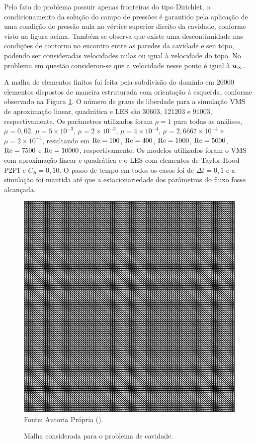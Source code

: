 Pelo fato do problema possuir apenas fronteiras do tipo Dirichlet, o condicionamento da solução do campo de pressões é garantido pela aplicação de uma condição de pressão nula no vértice superior direito da cavidade, conforme visto na figura acima.  Também se observa que existe uma descontinuidade nas condições de contorno no encontro entre as paredes da cavidade e seu topo, podendo ser consideradas velocidades nulas ou igual à velocidade do topo. No problema em questão considerou-se que a velocidade nesse ponto é igual à $\boldsymbol{u}_\infty$.

A malha de elementos finitos foi feita pela subdivisão do domínio em 20000 elementos dispostos de maneira estruturada com orientação à esquerda, conforme observado na Figura \ref{fig:cavity_disc}. O número de graus de liberdade para a simulação VMS de aproximação linear, quadrática e LES são 30603, 121203 e 91003, respectivamente. Os parâmetros utilizados foram $\rho=1$ para todas as análises, $\mu=0,02$, $\mu=5\times10^{-3}$, $\mu=2\times10^{-3}$, $\mu=4\times10^{-4}$, $\mu=2,6667\times10^{-4}$ e $\mu=2\times10^{-4}$, resultando em $\mathrm{Re}=100$, $\mathrm{Re}=400$, $\mathrm{Re}=1000$, $\mathrm{Re}=5000$, $\mathrm{Re}=7500$ e $\mathrm{Re}=10000$, respectivamente. Os modelos utilizados foram o VMS com aproximação linear e quadrática e o LES com elementos de Taylor-Hood P2P1 e $C_S=0,10$. O passo de tempo em todos os casos foi de $\Delta t=0,1$ e a simulação foi mantida até que a estacionariedade dos parâmetros do fluxo fosse alcançada.

\begin{figure}[h!]
    \centering
    \caption{Malha considerada para o problema de cavidade.}
    \includegraphics[width=.6\linewidth]{Figuras/Cavity/mesh.pdf}
    \\Fonte: Autoria Própria (\the\year).
    \label{fig:cavity_disc}
\end{figure}

